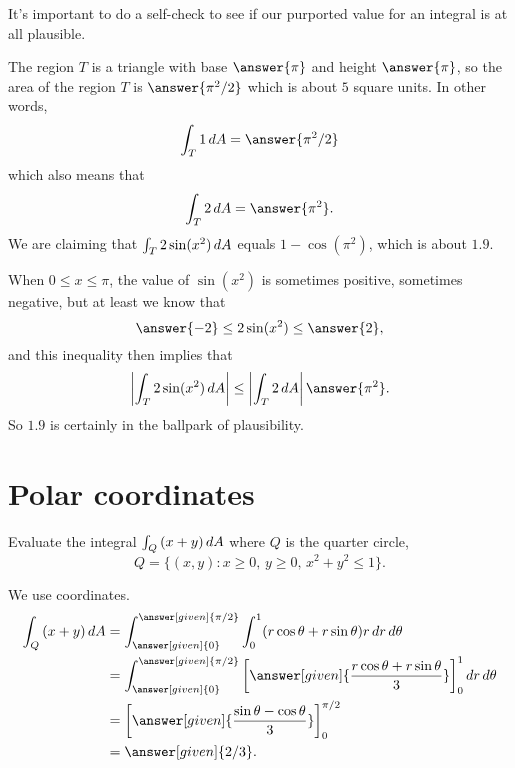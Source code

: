 \documentclass{ximera}
\begin{document}
\begin{question}
  It's important to do a self-check to see if our purported value for
  an integral is at all plausible.

  The region $T$ is a triangle with base $\answer{\pi}$ and height
  $\answer{\pi}$, so the area of the region $T$ is $\answer{\pi^2/2}$
  which is about $5$ square units.  In other words,
  \[
  \int_T 1 \d A = \answer{\pi^2/2}
  \]
  which also means that
  \[
  \int_T 2 \d A = \answer{\pi^2}.
  \]
  We are claiming that $\int_T 2 \sin (x^2) \mathop{}\!d A$ equals
  $1 - \cos (\pi^2)$, which is about $1.9$.

  When $0 \leq x \leq \pi$, the value of $\sin (x^2)$ is sometimes
  positive, sometimes negative, but at least we know that
  \[
  \answer{-2} \leq 2 \sin (x^2) \leq \answer{2},
  \]
  and this inequality then implies that
  \[
  \left| \int_T 2 \sin (x^2) \d A \right| \leq \left| \int_T 2 \d A \right| \answer{\pi^2}.
  \]
  So $1.9$ is certainly in the ballpark of plausibility.
\end{question}

\section{Polar coordinates}

\begin{example}
  Evaluate the integral $\int_Q \left(x + y\right) \mathop{}\!d A$ where $Q$ is the quarter circle,
  \[
  Q = \{ (x,y)  : \text{$x \geq 0$, $y \geq 0$, $x^2 + y^2 \leq 1$} \}.
  \]
  
  \begin{explanation}
    We use  coordinates.
    \begin{align*}
      \int_Q \left(x + y\right) \d A
      &= \int_{\answer[given]{0}}^{\answer[given]{\pi/2}} \int_{0}^{1} (r \cos \theta + r \sin \theta) r \d r \d \theta \\
      &= \int_{\answer[given]{0}}^{\answer[given]{\pi/2}} \eval{\answer[given]{\frac{r \cos \theta + r \sin \theta}{3}}}_0^1 \d r \d \theta \\  
      &= \eval{\answer[given]{\frac{\sin \theta - \cos \theta}{3}}}_{0}^{\pi/2} \\
      &= \answer[given]{2/3}.
    \end{align*}
  \end{explanation}
\end{example}
\end{document}

